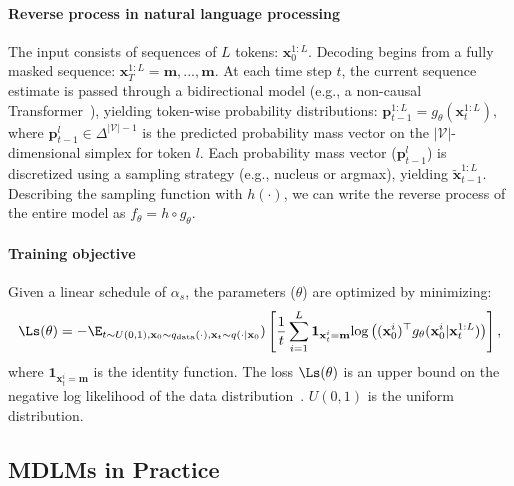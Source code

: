 \documentclass{article}
\begin{document}
\paragraph{Reverse process in natural language processing}
The input consists of sequences of $L$ tokens: $\mathbf{x}^{1:L}_0$. 
% 
Decoding begins from a fully masked sequence: $\mathbf{x}^{1:L}_T= \mathbf{m},...,\mathbf{m} $. 
% 
At each time step $t$, the current sequence estimate is passed through a bidirectional model (e.g., a non-causal Transformer~\citep{vaswani_attention_2017, peebles_scalable_2023}), yielding token-wise probability distributions:
$
    \mathbf{p}^{1:L}_{t-1}= g_\theta(\mathbf{x}^{1:L}_t), \label{eq:pmf}
$
where $\mathbf{p}^l_{t-1}\in \Delta^{\mathcal{|V|}-1}$ is the predicted probability mass vector on the $|\mathcal{V}|$-dimensional simplex for token $l$.
% 
Each probability mass vector ($\mathbf{p}^l_{t-1}$) is discretized using a sampling strategy (e.g., nucleus or argmax), yielding $\mathbf{\tilde{x}}^{1:L}_{t-1}$. 
% 
Describing the sampling function with $h(\cdot)$, we can write the reverse process of the entire model as $f_\theta= h \circ g_\theta  $. 
% 

\paragraph{Training objective}
Given a linear schedule of $\alpha_s$, the parameters ($\theta$) are optimized by minimizing: 
\begin{align*}
    \Ls(\theta) =-\E_{t\sim U(0, 1),\mathbf{x}_0 \sim q_{\text{data}}(\cdot),\mathbf{x}_t \sim q(\cdot|\mathbf{x}_0}) \left[ \frac{1}{t} \sum_{i=1}^{L} \mathbf{1}_{\mathbf{x}^i_t=\mathbf{m}} \text{log}\left( (\mathbf{x}_0^i)^\top g_{\theta} (\mathbf{x}_0^i |\mathbf{x}^{1:L}_t)\right) \right], 
\end{align*}
where $\mathbf{1}_{\mathbf{x}^i_t=\mathbf{m}}$ is the identity function. 
% 
The loss $\Ls(\theta)$ is an upper bound on the negative log likelihood of the data distribution~\citep{shi_simplified_2024, ou_your_2024}. 
% 
$U(0,1)$ is the uniform distribution. 

\subsection{MDLMs in Practice}
\end{document}
